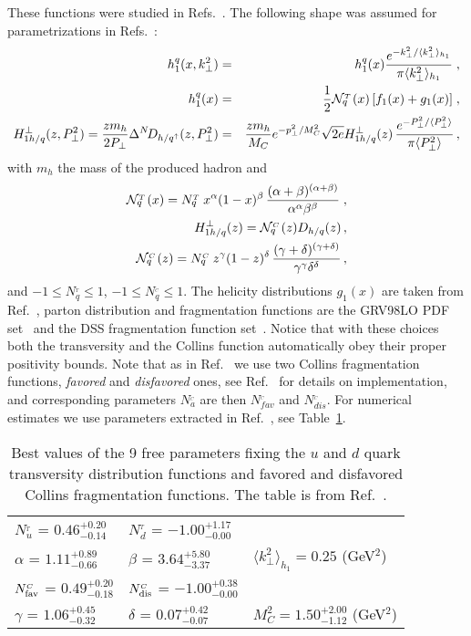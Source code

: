 \documentclass[a4paper,11pt]{article}
\newcommand{\ba}{\begin{eqnarray}}
\newcommand{\ea}{\end{eqnarray}}
\newcommand{\la}{\langle}
\newcommand{\ra}{\rangle}
\def\T{_{_T}}
\def\C{_{_C}}
\def\kperp{k_\perp}
\def\pperp{P_\perp}
\def\avkperp{\la \kperp^2 \ra}
\def\avpperp{\la \pperp^2 \ra}
\begin{document}
These functions were studied in  
Refs.~\cite{Anselmino:2007fs,Anselmino:2008jk,Anselmino:2013vqa,
Kang:2014zza,Kang:2015msa,Anselmino:2015sxa}.
The following shape was assumed for parametrizations in
Refs.~\cite{Anselmino:2007fs,Anselmino:2008jk,Anselmino:2013vqa}:
 \ba
h_{1}^{q} (x, \kperp^2) &=&h_{1}^{q} (x)  \frac{e^{-{\kperp^2}/{\avkperp_{h_1} }}}{\pi \avkperp_{h_1}} \; ,\label{tr-funct}\\
h_{1}^{q} (x) &=&\frac{1}{2} {\cal N}^{\T}_q(x)\,
[f_{1}(x)+g_1(x)]\; ,\\
H_{1 h/q}^{\perp}(z, \pperp^2) = \frac{z m_h}{2 \pperp} \Delta^N \! D_{h/q^\uparrow}(z,\pperp^2) &=&  \frac{z m_h}{M_C} e^{-p_{\perp}^2/M_C^2} \sqrt{2 e} H_{1 h/q}^{\perp}(z) \,\frac{e^{-\pperp^2/{\avpperp}}}{\pi \avpperp}\,,
\label{coll-funct}
 \ea
 with $m_h$ the mass of the produced hadron and
 \ba
 {\cal N}^{\T}_q(x)= N^{\T}_q
\,x^{\alpha} (1-x)^{\beta} \, \frac{(\alpha + \beta)^{(\alpha
+\beta)}} {\alpha^{\alpha} \beta^{\beta}}\; ,
\\
H_{1 h/q}^{\perp}(z) =  {\cal N}^{\C}_q(z) D_{h/q}(z)\, , \\
{\cal N}^{\C}_q(z)= N^{\C}_q \, z^{\gamma} (1-z)^{\delta} \,
\frac{(\gamma + \delta)^{(\gamma +\delta)}}
{\gamma^{\gamma} \delta^{\delta}}\, ,
 \ea
and $-1\le N^{\T}_q\le 1$, $-1 \le N^{\C}_q \le 1$. The helicity distributions $g_1(x)$ are taken
from Ref.~\cite{Gluck:2000dy}, parton distribution and fragmentation functions are the GRV98LO PDF set~\cite{Gluck:1998xa} and the
DSS fragmentation function set~\cite{deFlorian:2007aj}. Notice that with these choices both
the transversity and the Collins function automatically obey their
proper positivity bounds. Note that as in Ref.~\cite{Anselmino:2013vqa} we use two 
Collins fragmentation functions, {\it favored} and {\it disfavored} ones, see Ref.~\cite{Anselmino:2013vqa} for details on implementation, and corresponding parameters ${N}^{\C}_a$ are then  ${N}^{\C}_{fav}$ and ${N}^{\C}_{dis}$. For numerical estimates we use parameters extracted in Ref.~\cite{Anselmino:2013vqa}, see Table~\ref{fitpar}.

\begin{table}[h]
\centering
\renewcommand{\tabcolsep}{0.4pc} %
\renewcommand{\arraystretch}{1.2} %
\begin{tabular}{@{ }lll}
 \hline
 $N_{u}^{\T}$ = $0.46^{+0.20}_{-0.14}$ & $N_{d}^{\T}$ = $ -1.00^{+1.17}_{-0.00}$ \\
 $\alpha$ =  $1.11^{+0.89}_{-0.66}$ & $\beta$  = $3.64^{+5.80}_{-3.37}$ &
 $\avkperp_{h_1} = 0.25$ (GeV$^2$) \\
 \hline
 $N_{\rm fav}^{\C}$  = $0.49^{+0.20}_{-0.18}$ & $N_{\rm dis}^{\C}$  = 
 $-1.00^{+0.38}_{-0.00}$ \\
 $\gamma$  = $1.06^{+0.45}_{-0.32}$  & $\delta$   = $0.07^{+0.42}_{-0.07}$  &
 $M^2_C = 1.50^{+2.00}_{-1.12}$ (GeV$^2$) \\
 \hline
\end{tabular}
	\caption{Best values of the 9 free parameters fixing 
	the $u$ and $d$ quark transversity distribution functions and 
	favored and disfavored Collins fragmentation functions. 
	The table is from Ref.~\cite{Anselmino:2013vqa}.
\label{fitpar}}
\end{table}
\end{document}

